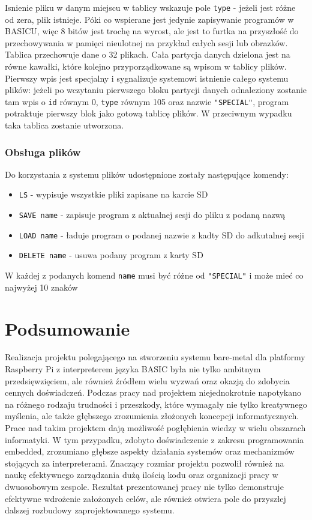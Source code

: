 \documentclass[shortabstract]{iithesis}
\begin{document}
Isnienie pliku w danym miejscu w tablicy wskazuje pole \texttt{type} - jeżeli jest różne od zera, plik istnieje. Póki co wspierane jest jedynie zapisywanie programów w BASICU, więc 8 bitów jest trochę na wyrost, ale jest to furtka na przyszłość do przechowywania w pamięci nieulotnej na przykład całych sesji lub obrazków. Tablica przechowuje dane o 32 plikach. Cała partycja danych dzielona jest na równe kawałki, które kolejno przyporządkowane są wpisom w tablicy plików. Pierwszy wpis jest specjalny i sygnalizuje systemowi istnienie całego systemu plików: jeżeli po wczytaniu pierwszego bloku partycji danych odnaleziony zostanie tam wpis o \texttt{id} równym 0, \texttt{type} równym 105 oraz nazwie \texttt{"SPECIAL"}, program potraktuje pierwszy blok jako gotową tablicę plików. W przeciwnym wypadku taka tablica zostanie utworzona.
\subsection{Obsługa plików}
Do korzystania z systemu plików udostępnione zostały następujące komendy: 
\begin{itemize}
 \item \texttt{LS} - wypisuje wszystkie pliki zapisane na karcie SD
 \item \texttt{SAVE name} - zapisuje program z aktualnej sesji do pliku z podaną nazwą
 \item \texttt{LOAD name} - ładuje program o podanej nazwie z kadty SD do adkutalnej sesji
 \item \texttt{DELETE name} - usuwa podany program z karty SD
\end{itemize}
W każdej z podanych komend \texttt{name} musi być różne od \texttt{"SPECIAL"} i może mieć co najwyżej 10 znaków


\chapter{Podsumowanie}
Realizacja projektu polegającego na stworzeniu systemu bare-metal dla platformy Raspberry Pi z interpreterem języka BASIC była nie tylko ambitnym przedsięwzięciem, ale również źródłem wielu wyzwań oraz okazją do zdobycia cennych doświadczeń. Podczas pracy nad projektem niejednokrotnie napotykano na różnego rodzaju trudności i przeszkody, które wymagały nie tylko kreatywnego myślenia, ale także głębszego zrozumienia złożonych koncepcji informatycznych.
Prace nad takim projektem dają możliwość pogłębienia wiedzy w wielu obszarach informatyki. W tym przypadku, zdobyto doświadczenie z zakresu programowania embedded, zrozumiano głębsze aspekty działania systemów oraz mechanizmów stojących za interpreterami. Znaczący rozmiar projektu pozwolił również na naukę efektywnego zarządzania dużą ilością kodu oraz organizacji pracy w dwuosobowym zespole.
Rezultat prezentowanej pracy nie tylko demonstruje efektywne wdrożenie założonych celów, ale również otwiera pole do przyszłej dalszej rozbudowy zaprojektowanego systemu. 
\end{document}

